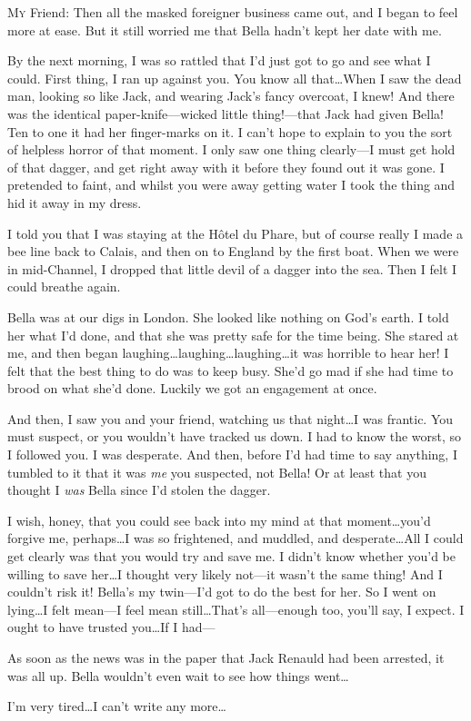 \begin{mail}{}{\lettrine{M}{y} Friend:}
Then all the masked foreigner business came out, and I began to feel more at ease. But it still worried me that Bella hadn't kept her date with me.

By the next morning, I was so rattled that I'd just got to go and see what I could. First thing, I ran up against you. You know all that\dots When I saw the dead man, looking so like Jack, and wearing Jack's fancy overcoat, I knew! And there was the identical paper-knife—wicked little thing!—that Jack had given Bella! Ten to one it had her finger-marks on it. I can't hope to explain to you the sort of helpless horror of that moment. I only saw one thing clearly—I must get hold of that dagger, and get right away with it before they found out it was gone. I pretended to faint, and whilst you were away getting water I took the thing and hid it away in my dress.

I told you that I was staying at the Hôtel du Phare, but of course really I made a bee line back to Calais, and then on to England by the first boat. When we were in mid-Channel, I dropped that little devil of a dagger into the sea. Then I felt I could breathe again.

Bella was at our digs in London. She looked like nothing on God's earth. I told her what I'd done, and that she was pretty safe for the time being. She stared at me, and then began laughing\dots laughing\dots laughing\dots it was horrible to hear her! I felt that the best thing to do was to keep busy. She'd go mad if she had time to brood on what she'd done. Luckily we got an engagement at once.

And then, I saw you and your friend, watching us that night\dots I was frantic. You must suspect, or you wouldn't have tracked us down. I had to know the worst, so I followed you. I was desperate. And then, before I'd had time to say anything, I tumbled to it that it was \emph{me} you suspected, not Bella! Or at least that you thought I \emph{was} Bella since I'd stolen the dagger.

I wish, honey, that you could see back into my mind at that moment\dots you'd forgive me, perhaps\dots I was so frightened, and muddled, and desperate\dots All I could get clearly was that you would try and save me. I didn't know whether you'd be willing to save her\dots I thought very likely not—it wasn't the same thing! And I couldn't risk it! Bella's my twin—I'd got to do the best for her. So I went on lying\dots I felt mean—I feel mean still\dots That's all—enough too, you'll say, I expect. I ought to have trusted you\dots If I had—

As soon as the news was in the paper that Jack Renauld had been arrested, it was all up. Bella wouldn't even wait to see how things went\dots

I'm very tired\dots I can't write any more\dots
\end{mail}

